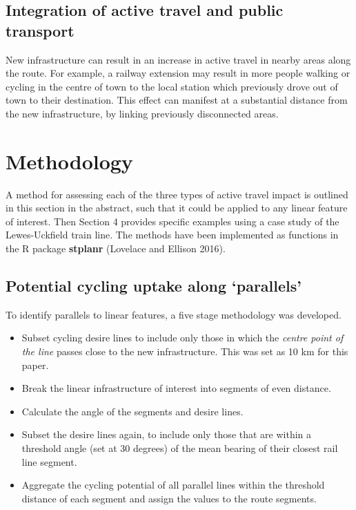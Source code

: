 \documentclass[11pt]{article}
\begin{document}
\subsection{Integration of active travel and public
transport}\label{integration-of-active-travel-and-public-transport}

New infrastructure can result in an increase in active travel in nearby
areas along the route. For example, a railway extension may result in
more people walking or cycling in the centre of town to the local
station which previously drove out of town to their destination. This
effect can manifest at a substantial distance from the new
infrastructure, by linking previously disconnected areas.

\section{Methodology}\label{methodology}

A method for assessing each of the three types of active travel impact
is outlined in this section in the abstract, such that it could be
applied to any linear feature of interest. Then Section 4 provides
specific examples using a case study of the Lewes-Uckfield train line.
The methods have been implemented as functions in the R package
\textbf{stplanr} (Lovelace and Ellison 2016).

\subsection{\texorpdfstring{Potential cycling uptake along
`parallels'}{Potential cycling uptake along parallels}}\label{potential-cycling-uptake-along-parallels}

To identify parallels to linear features, a five stage methodology was
developed.

\begin{itemize}
\item
  Subset cycling desire lines
  to include only those in which the \emph{centre point of the line}
  passes close to the new infrastructure. This was set as 10 km for this
  paper.
\item
  Break the linear infrastructure of interest into segments of even
  distance.
\item
  Calculate the angle of the segments and desire lines.
\item
  Subset the desire lines again, to include only those that are within a
  threshold angle (set at 30 degrees) of the mean bearing of their
  closest rail line segment.
\item
  Aggregate the cycling potential of all parallel lines within the
  threshold distance of each segment and assign the values to the route
  segments.
\end{itemize}
\end{document}
